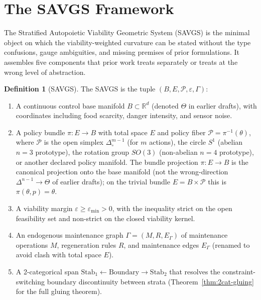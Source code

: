 \documentclass[11pt,a4paper]{article}
\theoremstyle{plain}
\theoremstyle{definition}
\newtheorem{definition}[theorem]{Definition}
\theoremstyle{remark}
\newcommand{\RR}{\mathbb{R}}
\newcommand{\Stab}{\mathrm{Stab}}
\begin{document}
\section{The SAVGS Framework}\label{sec:savgs}

The Stratified Autopoietic Viability Geometric System (SAVGS) is the
minimal object on which the viability-weighted curvature can be stated
without the type confusions, gauge ambiguities, and missing premises of
prior formulations. It assembles five components that prior work treats
separately or treats at the wrong level of abstraction.

\begin{definition}[SAVGS]
\label{def:savgs}
The SAVGS is the tuple $(B, E, \mathcal P, \varepsilon, \Gamma)$:
\begin{enumerate}[leftmargin=*,itemsep=2pt]
\item A continuous control base manifold $B \subset \RR^d$ (denoted
$\Theta$ in earlier drafts), with coordinates including food
scarcity, danger intensity, and sensor noise.
\item A policy bundle $\pi : E \to B$ with total space $E$ and policy
fiber $\mathcal P = \pi^{-1}(\theta)$, where $\mathcal P$ is the open
simplex $\Delta^{m-1}_\circ$ (for $m$ actions), the circle $S^1$
(abelian $n=3$ prototype), the rotation group $SO(3)$ (non-abelian
$n=4$ prototype), or another declared policy manifold. The bundle
projection $\pi : E \to B$ is the canonical projection onto the base
manifold (not the wrong-direction $\Delta^{n-1} \to \Theta$ of earlier
drafts); on the trivial bundle $E = B \times \mathcal P$ this is
$\pi(\theta, p) = \theta$.
\item A viability margin $\varepsilon\geq\varepsilon_{\min}>0$, with
the inequality strict on the open feasibility set and non-strict on the
closed viability kernel.
\item An endogenous maintenance graph $\Gamma=(M, R, E_\Gamma)$ of
maintenance operations $M$, regeneration rules $R$, and maintenance
edges $E_\Gamma$ (renamed to avoid clash with total space $E$).
\item A 2-categorical span $\Stab_1\leftarrow\mathrm{Boundary}\rightarrow
\Stab_2$ that resolves the constraint-switching boundary discontinuity
between strata (Theorem~\ref{thm:2cat-gluing} for
the full gluing theorem).
\end{enumerate}
\end{definition}
\end{document}
